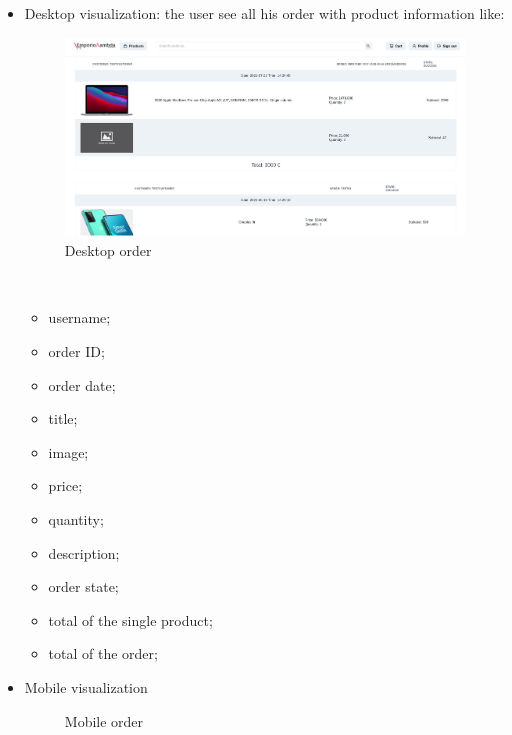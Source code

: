 \begin{itemize}
    \item Desktop visualization:
          the user see all his order with product information like:
          \begin{figure}[!ht]
              \caption{Desktop order}
              \vspace{10px}
              \includegraphics[scale=0.2]{../../../../Images/userManual/orderDesktop.png}
              \centering
          \end{figure}
          \\
          \begin{itemize}
              \item username;
              \item order ID;
              \item order date;
              \item title;
              \item image;
              \item price;
              \item quantity;
              \item description;
              \item order state;
              \item total of the single product;
              \item total of the order;
          \end{itemize}
          \newpage
    \item Mobile visualization
          \begin{figure}[!ht]
              \caption{Mobile order}
              \vspace{10px}

\end{figure}
\end{itemize}

